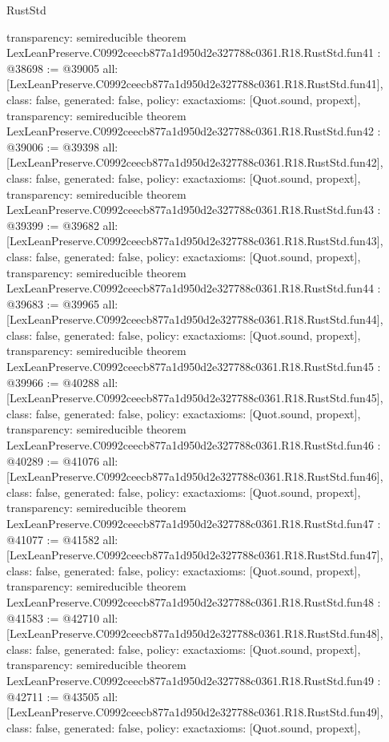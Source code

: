 \begin{lexlean}{RustStd}
\begin{coremodule}
{  transparency: semireducible
}
theorem LexLeanPreserve.C0992ceecb877a1d950d2e327788c0361.R18.RustStd.fun41 : @38698 := @39005 {
  all: [LexLeanPreserve.C0992ceecb877a1d950d2e327788c0361.R18.RustStd.fun41],
  class: false,
  generated: false,
  policy: exact{axioms: [Quot.sound, propext]},
  transparency: semireducible
}
theorem LexLeanPreserve.C0992ceecb877a1d950d2e327788c0361.R18.RustStd.fun42 : @39006 := @39398 {
  all: [LexLeanPreserve.C0992ceecb877a1d950d2e327788c0361.R18.RustStd.fun42],
  class: false,
  generated: false,
  policy: exact{axioms: [Quot.sound, propext]},
  transparency: semireducible
}
theorem LexLeanPreserve.C0992ceecb877a1d950d2e327788c0361.R18.RustStd.fun43 : @39399 := @39682 {
  all: [LexLeanPreserve.C0992ceecb877a1d950d2e327788c0361.R18.RustStd.fun43],
  class: false,
  generated: false,
  policy: exact{axioms: [Quot.sound, propext]},
  transparency: semireducible
}
theorem LexLeanPreserve.C0992ceecb877a1d950d2e327788c0361.R18.RustStd.fun44 : @39683 := @39965 {
  all: [LexLeanPreserve.C0992ceecb877a1d950d2e327788c0361.R18.RustStd.fun44],
  class: false,
  generated: false,
  policy: exact{axioms: [Quot.sound, propext]},
  transparency: semireducible
}
theorem LexLeanPreserve.C0992ceecb877a1d950d2e327788c0361.R18.RustStd.fun45 : @39966 := @40288 {
  all: [LexLeanPreserve.C0992ceecb877a1d950d2e327788c0361.R18.RustStd.fun45],
  class: false,
  generated: false,
  policy: exact{axioms: [Quot.sound, propext]},
  transparency: semireducible
}
theorem LexLeanPreserve.C0992ceecb877a1d950d2e327788c0361.R18.RustStd.fun46 : @40289 := @41076 {
  all: [LexLeanPreserve.C0992ceecb877a1d950d2e327788c0361.R18.RustStd.fun46],
  class: false,
  generated: false,
  policy: exact{axioms: [Quot.sound, propext]},
  transparency: semireducible
}
theorem LexLeanPreserve.C0992ceecb877a1d950d2e327788c0361.R18.RustStd.fun47 : @41077 := @41582 {
  all: [LexLeanPreserve.C0992ceecb877a1d950d2e327788c0361.R18.RustStd.fun47],
  class: false,
  generated: false,
  policy: exact{axioms: [Quot.sound, propext]},
  transparency: semireducible
}
theorem LexLeanPreserve.C0992ceecb877a1d950d2e327788c0361.R18.RustStd.fun48 : @41583 := @42710 {
  all: [LexLeanPreserve.C0992ceecb877a1d950d2e327788c0361.R18.RustStd.fun48],
  class: false,
  generated: false,
  policy: exact{axioms: [Quot.sound, propext]},
  transparency: semireducible
}
theorem LexLeanPreserve.C0992ceecb877a1d950d2e327788c0361.R18.RustStd.fun49 : @42711 := @43505 {
  all: [LexLeanPreserve.C0992ceecb877a1d950d2e327788c0361.R18.RustStd.fun49],
  class: false,
  generated: false,
  policy: exact{axioms: [Quot.sound, propext]},
}
\end{coremodule}
\end{lexlean}
